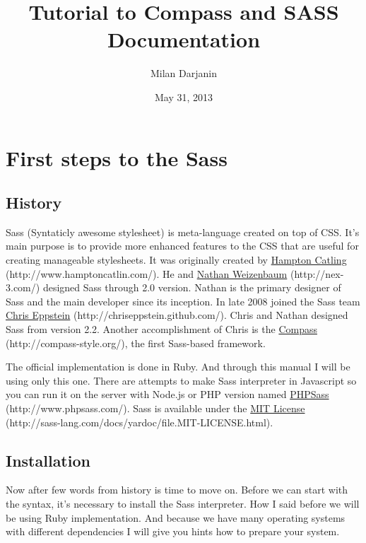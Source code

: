 \documentclass[a4paper,12pt,oneside]{sphinxmanual}
\title{Tutorial to Compass and SASS Documentation}
\date{May 31, 2013}
\author{Milan Darjanin}
\begin{document}
\maketitle
\tableofcontents
{}\label{index::doc}



\chapter{First steps to the Sass}
\label{src/first_steps_to_the_sass:first-steps-to-the-sass}\label{src/first_steps_to_the_sass:table-of-content}\label{src/first_steps_to_the_sass::doc}

\section{History}
\label{src/first_steps_to_the_sass:history}
Sass (Syntaticly awesome stylesheet) is meta-language created on top of CSS. It's main purpose is to provide more enhanced features to the CSS that are useful for creating manageable stylesheets. It was originally created by \href{http://www.hamptoncatlin.com/}{Hampton Catling} (http://www.hamptoncatlin.com/). He and \href{http://nex-3.com/}{Nathan Weizenbaum} (http://nex-3.com/) designed Sass through 2.0 version. Nathan is the primary designer of Sass and the main developer since its inception. In late 2008 joined the Sass team \href{http://chriseppstein.github.com/}{Chris Eppstein} (http://chriseppstein.github.com/). Chris and Nathan designed Sass from version 2.2. Another accomplishment of Chris is the \href{http://compass-style.org/}{Compass} (http://compass-style.org/), the first Sass-based framework.

The official implementation is done in Ruby. And through this manual I will be using only this one. There are attempts to make Sass interpreter in Javascript so you can run it on the server with Node.js or PHP version named \href{http://www.phpsass.com/}{PHPSass} (http://www.phpsass.com/). Sass is available under the \href{http://sass-lang.com/docs/yardoc/file.MIT-LICENSE.html}{MIT License} (http://sass-lang.com/docs/yardoc/file.MIT-LICENSE.html).


\section{Installation}
\label{src/first_steps_to_the_sass:installation}
Now after few words from history is time to move on. Before we can start with the syntax, it's necessary to install the Sass interpreter. How I said before we will be using Ruby implementation. And because we have many operating systems with different dependencies I will give you hints how to prepare your system.
\end{document}
